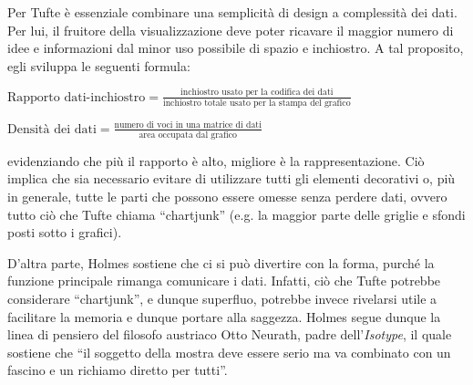 Per Tufte è essenziale combinare una semplicità di design a complessità dei dati. Per lui, il fruitore della visualizzazione deve poter ricavare il maggior numero di idee e informazioni dal minor uso possibile di spazio e inchiostro.
A tal proposito, egli sviluppa le seguenti formula: 
\begin{center}
    $\text{Rapporto dati-inchiostro} = \frac{\text{inchiostro usato per la codifica dei dati}}{\text{inchiostro totale usato per la stampa del grafico}}$
\end{center}
\begin{center}
    $\text{Densità dei dati} = \frac{\text{numero di voci in una matrice di dati}}{\text{area occupata dal grafico}}$            %
\end{center}
evidenziando che più il rapporto è alto, migliore è la rappresentazione. Ciò implica che sia necessario evitare di utilizzare tutti gli elementi decorativi o, più in generale, tutte le parti che possono essere omesse 
senza perdere dati, ovvero tutto ciò che Tufte chiama ``chartjunk'' (e.g. la maggior parte delle griglie e sfondi posti sotto i grafici).

D'altra parte, Holmes sostiene che ci si può divertire con la forma, purché la funzione principale rimanga comunicare i dati. Infatti, ciò che Tufte potrebbe considerare ``chartjunk'', e dunque superfluo,
potrebbe invece rivelarsi utile a facilitare la memoria e dunque portare alla saggezza. Holmes segue dunque la linea di pensiero del filosofo austriaco Otto Neurath, padre dell'\emph{Isotype}, il quale sostiene che 
``il soggetto della mostra deve essere serio ma va combinato con un fascino e un richiamo diretto per tutti''.

